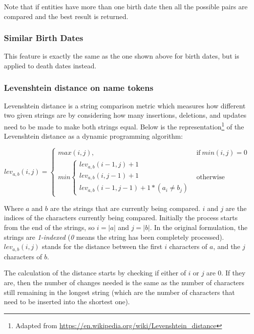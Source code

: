 \documentclass[epsfig,a4paper,11pt,titlepage,twoside,openany]{book}
\begin{document}
Note that if entities have more than one birth date then all the possible pairs are compared and the best result is returned.  
 
 
\subsubsection{Similar Birth Dates}
\label{sec:feature-similar-death-dates}
 
This feature is exactly the same as the one shown above for birth dates, but is applied to death dates instead.


\subsubsection{Levenshtein distance on name tokens}
\label{sec:feature-levenshtein-on-name-tokens}

Levenshtein distance \cite{levenshtein1966binary} is a string comparison metric which measures how different two given strings are by considering how many insertions, deletions, and updates need to be made to make both strings equal. Below is the representation\footnote{Adapted from \url{https://en.wikipedia.org/wiki/Levenshtein_distance}} of the Levenshtein distance as a dynamic programming algorithm:

\begin{equation*}
  lev_{a,b}(i,j) =
  \begin{cases}
    max(i, j), & \text{if}\ min(i,j) = 0  \\
    min   
    \begin{cases}
        lev_{a,b}(i-1,j) + 1  \\
        lev_{a,b}(i,j-1) + 1  \\
        lev_{a,b}(i-1,j-1) + 1 * (a_i \neq b_j)  
    \end{cases} & \text{otherwise}
  \end{cases}
\end{equation*}

Where $a$ and $b$ are the strings that are currently being compared. $i$ and $j$ are the indices of the characters currently being compared. Initially the process starts from the end of the strings, so $i = |a|$ and $j=|b|$. In the original formulation, the strings are \textit{1-indexed} (\textit{0} means the string has been completely processed). $lev_{a,b}(i,j)$ stands for the distance between the first $i$ characters of $a$, and the $j$ characters of $b$. 

The calculation of the distance starts by checking if either of $i$ or $j$ are 0. If they are, then the number of changes needed is the same as the number of characters still remaining in the longest string (which are the number of characters that need to be inserted into the shortest one). 
\end{document}
